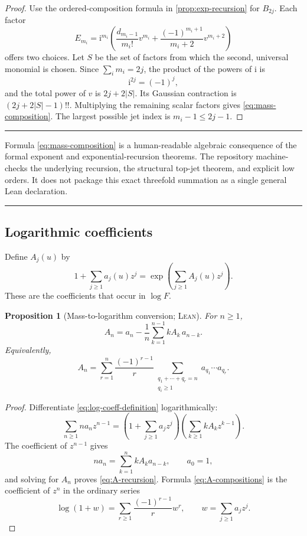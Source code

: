 \documentclass[11pt,oneside]{article}
\newtheorem{proposition}[theorem]{Proposition}
\theoremstyle{definition}
\theoremstyle{remark}
\newcommand{\ii}{\mathrm i}
\newenvironment{boxedremark}{%
  \par\smallskip\noindent\begin{center}\begin{minipage}{0.94\textwidth}%
  \color{black}\hrule\vspace{0.6em}\small
}{%
  \vspace{0.6em}\hrule\end{minipage}\end{center}\smallskip
}
\newcommand{\Formalized}{\textsc{Lean}}
\begin{document}
\begin{proof}
Use the ordered-composition formula in
\cref{prop:exp-recursion} for $B_{2j}$.  Each factor
\[
 E_{m_i}
 =\ii^{m_i}\left(
   \frac{d_{m_i-1}}{m_i!}v^{m_i}
   +\frac{(-1)^{m_i+1}}{m_i+2}v^{m_i+2}
 \right)
\]
offers two choices.  Let $S$ be the set of factors from which the second,
universal monomial is chosen.  Since $\sum_i m_i=2j$, the product of the
powers of $\ii$ is
\[
 \ii^{2j}=(-1)^j,
\]
and the total power of $v$ is $2j+2|S|$.  Its Gaussian contraction is
$(2j+2|S|-1)!!$.  Multiplying the remaining scalar factors gives
\eqref{eq:mass-composition}.  The largest possible jet index is
$m_i-1\leq2j-1$.
\end{proof}

\begin{boxedremark}
Formula \eqref{eq:mass-composition} is a human-readable algebraic
consequence of the formal exponent and exponential-recursion theorems.
The repository machine-checks the underlying recursion, the structural
top-jet theorem, and explicit low orders.  It does not package this exact
threefold summation as a single general Lean declaration.
\end{boxedremark}

\subsection{Logarithmic coefficients}

Define $A_j(u)$ by
\begin{equation}
 1+\sum_{j\geq1}a_j(u)z^j
 =\exp\!\left(\sum_{j\geq1}A_j(u)z^j\right).
 \label{eq:log-coeff-definition}
\end{equation}
These are the coefficients that occur in $\log F$.

\begin{proposition}[Mass-to-logarithm conversion; \Formalized]
\label{prop:log-recursion}
For $n\geq1$,
\begin{equation}
 A_n
 =a_n-\frac1n\sum_{k=1}^{n-1}kA_k\,a_{n-k}.
 \label{eq:A-recursion}
\end{equation}
Equivalently,
\begin{equation}
 A_n
 =\sum_{r=1}^n\frac{(-1)^{r-1}}r
   \sum_{\substack{q_1+\cdots+q_r=n\\q_i\geq1}}
   a_{q_1}\cdots a_{q_r}. \label{eq:A-compositions}
\end{equation}
\end{proposition}

\begin{proof}
Differentiate \eqref{eq:log-coeff-definition} logarithmically:
\[
 \sum_{n\geq1}na_nz^{n-1}
 =
 \left(1+\sum_{j\geq1}a_jz^j\right)
 \left(\sum_{k\geq1}kA_kz^{k-1}\right).
\]
The coefficient of $z^{n-1}$ gives
\[
 na_n=\sum_{k=1}^n kA_ka_{n-k},
 \qquad a_0=1,
\]
and solving for $A_n$ proves \eqref{eq:A-recursion}.  Formula
\eqref{eq:A-compositions} is the coefficient of $z^n$ in the ordinary
series
\[
 \log(1+w)=\sum_{r\geq1}\frac{(-1)^{r-1}}r w^r,
 \qquad w=\sum_{j\geq1}a_jz^j.
\]
\end{proof}
\end{document}
